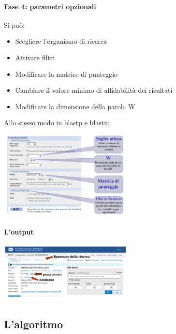 \documentclass{article}
\begin{document}
\paragraph{Fase 4: parametri opzionali}
Si può:
\begin{itemize}
    \item Scegliere l'organismo di ricerca
    \item Attivare filtri
    \item Modificare la matrice di punteggio
    \item Cambiare il valore minimo di affidabilità dei risultati
    \item Modificare la dimensione della parola W
\end{itemize}
Allo stesso modo in blastp e blastn:
\begin{center}
    \includegraphics[width=0.5\textwidth]{figures/fase4.png}
\end{center}
\paragraph{L'output}
\begin{center}
    \includegraphics[width=0.5\textwidth]{figures/output.png}
\end{center}
\subsection{L'algoritmo}
\end{document}
